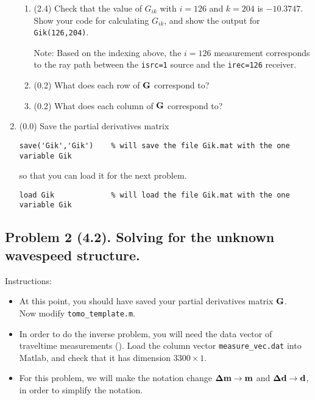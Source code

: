 \documentclass[11pt,titlepage,fleqn]{article}
\begin{document}
\begin{enumerate}
\begin{enumerate}
\item (2.4) Check that the value of $G_{ik}$ with $i=126$ and $k=204$ is $-10.3747$. \\ Show your code for calculating $G_{ik}$, and show the output for \verb+Gik(126,204)+.

Note: Based on the indexing above, the $i=126$ measurement corresponds to the ray path between the \verb+isrc=1+ source and the \verb+irec=126+ receiver.

\item (0.2) What does each row of $\mbox{${\bf G}$}$ correspond to?

\item (0.2) What does each column of $\mbox{${\bf G}$}$ correspond to?
\end{enumerate}


\item (0.0) Save the partial derivatives matrix
%
\begin{verbatim}
save('Gik','Gik')    % will save the file Gik.mat with the one variable Gik
\end{verbatim}
%
so that you can load it for the next problem.
%
\begin{verbatim}
load Gik             % will load the file Gik.mat with the one variable Gik
\end{verbatim}

\end{enumerate}


\subsection*{Problem 2 (4.2). Solving for the unknown wavespeed structure.}

Instructions:
%
\begin{itemize}
\item At this point, you should have saved your partial derivatives matrix $\mbox{${\bf G}$}$. \\ Now modify \verb+tomo_template.m+.

\item In order to do the inverse problem, you will need the data vector of traveltime measurements (). Load the column vector \verb+measure_vec.dat+ into Matlab, and check that it has dimension $3300 \times 1$.

\item For this problem, we will make the notation change $\mbox{\boldmath $\bf \Delta$}\mbox{${\bf m}$} \rightarrow \mbox{${\bf m}$}$ and $\mbox{\boldmath $\bf \Delta$}\mbox{${\bf d}$} \rightarrow \mbox{${\bf d}$}$, in order to simplify the notation.
\end{itemize}
\end{document}
